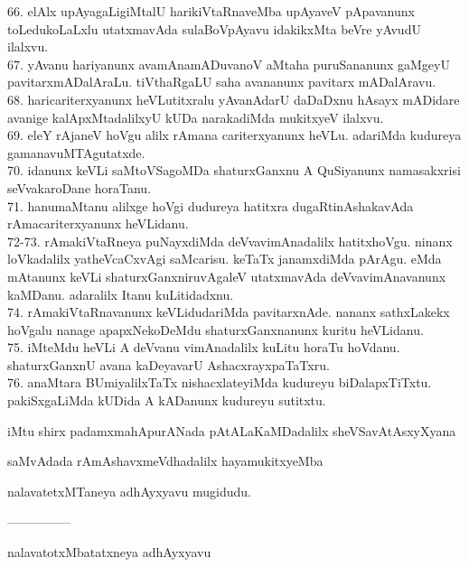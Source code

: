 \documentclass{article}
\begin{document}
66. elAlx upAyagaLigiMtalU harikiVtaRnaveMba upAyaveV pApavanunx toLedukoLaLxlu utatxmavAda sulaBoVpAyavu idakikxMta beVre yAvudU ilalxvu.\\
67. yAvanu hariyanunx avamAnamADuvanoV aMtaha puruSananunx gaMgeyU pavitarxmADalAraLu. tiVthaRgaLU saha avananunx pavitarx mADalAravu.\\
68. haricariterxyanunx heVLutitxralu yAvanAdarU daDaDxnu hAsayx mADidare avanige kalApxMtadalilxyU kUDa narakadiMda mukitxyeV ilalxvu.\\
69. eleY rAjaneV hoVgu alilx rAmana cariterxyanunx heVLu. adariMda kudureya gamanavuMTAgutatxde.\\
70. idanunx keVLi saMtoVSagoMDa shaturxGanxnu A QuSiyanunx namasakxrisi seVvakaroDane horaTanu.\\
71. hanumaMtanu alilxge hoVgi dudureya hatitxra dugaRtinAshakavAda rAmacariterxyanunx heVLidanu.\\
72-73. rAmakiVtaRneya puNayxdiMda deVvavimAnadalilx hatitxhoVgu. ninanx loVkadalilx yatheVcaCxvAgi saMcarisu. keTaTx janamxdiMda pArAgu. eMda mAtanunx keVLi shaturxGanxniruvAgaleV utatxmavAda deVvavimAnavanunx kaMDanu. adaralilx Itanu kuLitidadxnu.\\
74. rAmakiVtaRnavanunx keVLidudariMda pavitarxnAde. nananx sathxLakekx hoVgalu nanage apapxNekoDeMdu shaturxGanxnanunx kuritu heVLidanu.\\
75. iMteMdu heVLi A deVvanu vimAnadalilx kuLitu horaTu hoVdanu. shaturxGanxnU avana kaDeyavarU AshacxrayxpaTaTxru.\\
76. anaMtara BUmiyalilxTaTx nishacxlateyiMda kudureyu biDalapxTiTxtu. pakiSxgaLiMda kUDida A kADanunx kudureyu sutitxtu.

\begin{center}
iMtu shirx padamxmahApurANada pAtALaKaMDadalilx sheVSavAtAsxyXyana
\end{center}

\begin{center}
saMvAdada rAmAshavxmeVdhadalilx hayamukitxyeMba
\end{center}

\begin{center}
nalavatetxMTaneya adhAyxyavu mugidudu.
\end{center}

\begin{center}
---------------
\end{center}

\begin{center}
nalavatotxMbatatxneya adhAyxyavu
\end{center}
\end{document}

